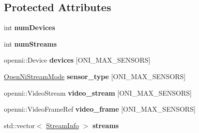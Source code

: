 \subsection*{Protected Attributes}
\begin{DoxyCompactItemize}
\item 
int {\bfseries num\+Devices}\hypertarget{structpangolin_1_1_open_ni_video2_a591547a69e59f7021fdf6088d3795f72}{}\label{structpangolin_1_1_open_ni_video2_a591547a69e59f7021fdf6088d3795f72}

\item 
int {\bfseries num\+Streams}\hypertarget{structpangolin_1_1_open_ni_video2_a2c8b3b00243e87c0fdfd3d83f47e267f}{}\label{structpangolin_1_1_open_ni_video2_a2c8b3b00243e87c0fdfd3d83f47e267f}

\item 
openni\+::\+Device {\bfseries devices} \mbox{[}O\+N\+I\+\_\+\+M\+A\+X\+\_\+\+S\+E\+N\+S\+O\+RS\mbox{]}\hypertarget{structpangolin_1_1_open_ni_video2_abe4d77667a3a14ee506cad7c52883f0e}{}\label{structpangolin_1_1_open_ni_video2_abe4d77667a3a14ee506cad7c52883f0e}

\item 
\hyperlink{structpangolin_1_1_open_ni_stream_mode}{Open\+Ni\+Stream\+Mode} {\bfseries sensor\+\_\+type} \mbox{[}O\+N\+I\+\_\+\+M\+A\+X\+\_\+\+S\+E\+N\+S\+O\+RS\mbox{]}\hypertarget{structpangolin_1_1_open_ni_video2_a3e97f9399e40bc2f291bdb6272a21368}{}\label{structpangolin_1_1_open_ni_video2_a3e97f9399e40bc2f291bdb6272a21368}

\item 
openni\+::\+Video\+Stream {\bfseries video\+\_\+stream} \mbox{[}O\+N\+I\+\_\+\+M\+A\+X\+\_\+\+S\+E\+N\+S\+O\+RS\mbox{]}\hypertarget{structpangolin_1_1_open_ni_video2_a88808fe1e6b593f452cb1bc567c80209}{}\label{structpangolin_1_1_open_ni_video2_a88808fe1e6b593f452cb1bc567c80209}

\item 
openni\+::\+Video\+Frame\+Ref {\bfseries video\+\_\+frame} \mbox{[}O\+N\+I\+\_\+\+M\+A\+X\+\_\+\+S\+E\+N\+S\+O\+RS\mbox{]}\hypertarget{structpangolin_1_1_open_ni_video2_a3dbfeeb2cd27f814fea8468b2bc5fcef}{}\label{structpangolin_1_1_open_ni_video2_a3dbfeeb2cd27f814fea8468b2bc5fcef}

\item 
std\+::vector$<$ \hyperlink{classpangolin_1_1_stream_info}{Stream\+Info} $>$ {\bfseries streams}\hypertarget{structpangolin_1_1_open_ni_video2_a3d3ec9bf9379c7e9520a32853a6c37cc}{}\label{structpangolin_1_1_open_ni_video2_a3d3ec9bf9379c7e9520a32853a6c37cc}


\end{DoxyCompactItemize}

